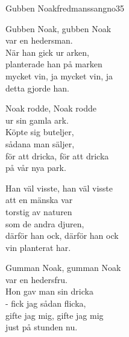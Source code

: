 \begin{song}{Gubben Noak}{fredmanssangno35}
\begin{vers}
Gubben Noak, gubben Noak \\
var en hedersman.\\
När han gick ur arken,\\
planterade han på marken\\
mycket vin, ja mycket vin, ja\\
detta gjorde han.\\
\end{vers}
\begin{vers}
Noak rodde, Noak rodde \\
ur sin gamla ark.\\
Köpte sig buteljer,\\
sådana man säljer,\\
för att dricka, för att dricka\\
på vår nya park.\\
\end{vers}


\begin{vers}
Han väl visste, han väl visste \\
att en mänska var\\
torstig av naturen\\
som de andra djuren,\\
därför han ock, därför han ock\\
vin planterat har.\\
\end{vers}

\newp

\begin{vers}
Gumman Noak, gumman Noak \\
var en hedersfru.\\
Hon gav man sin dricka\\
- fick jag sådan flicka,\\
gifte jag mig, gifte jag mig\\
just på stunden nu.\\
\end{vers}
\end{song}

